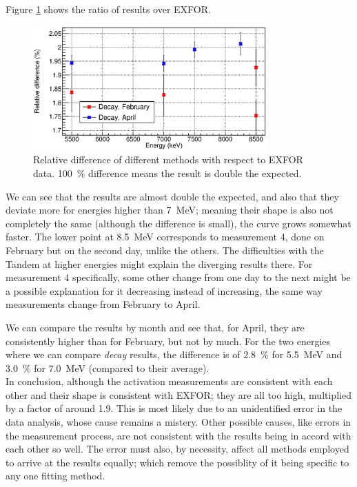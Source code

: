 \documentclass[a4paper,12pt]{report}
\begin{document}
Figure \ref{activation_result_diffs} shows the ratio of results over EXFOR.

\begin{figure}[H]
	\centering
	\includegraphics[width=0.80\textwidth]{activation_result_diffs.eps}
	\caption{Relative difference of different methods with respect to EXFOR data.
	\qty{+100}{\percent} difference means the result is double the expected.}
	\label{activation_result_diffs}
\end{figure}

We can see that the results are almost double the expected, and also that they deviate more for energies higher than \qty{7}{\MeV}; meaning their shape is also not completely the same (although the difference is small), the curve grows somewhat faster.
The lower point at \qty{8.5}{\MeV} corresponds to measurement 4, done on February but on the second day, unlike the others.
The difficulties with the Tandem at higher energies might explain the diverging results there.
For measurement 4 specifically, some other change from one day to the next might be a possible explanation for it decreasing instead of increasing, the same way measurements change from February to April.

We can compare the results by month and see that, for April, they are consistently higher than for February, but not by much.
For the two energies where we can compare \textit{decay} results, the difference is of \qty{2.8}{\percent} for \qty{5.5}{\MeV} and \qty{3.0}{\percent} for \qty{7.0}{\MeV} (compared to their average).
\\

In conclusion, although the activation measurements are consistent with each other and their shape is consistent with EXFOR; they are all too high, multiplied by a factor of around \num{1.9}.
This is most likely due to an unidentified error in the data analysis, whose cause remains a mistery.
Other possible causes, like errors in the measurement process, are not consistent with the results being in accord with each other so well.
The error must also, by necessity, affect all methods employed to arrive at the results equally; which remove the possiblity of it being specific to any one fitting method.
\end{document}
